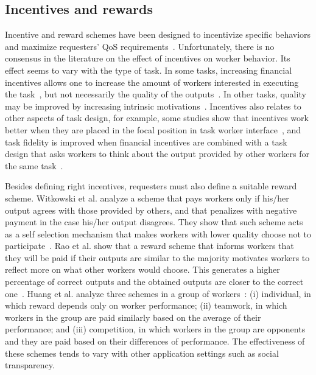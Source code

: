 \documentclass[11pt]{bmc_article_s50}
\begin{document}
\subsection{Incentives and rewards}

Incentive and reward schemes have been designed to incentivize specific behaviors and maximize requesters' QoS requirements~\cite{Singla:www:2013,Singer:www:2013,Scekic:CommunACM:2013}. Unfortunately, there is no consensus in the literature on the effect of incentives on worker behavior. Its effect seems to vary with the type of task. In some tasks, increasing financial incentives allows one to increase the amount of workers interested in executing the task~\cite{Barowy:2012,Mason:2009,Archak:2010}, but not necessarily the quality of the outputs~\cite{Mason:2009}. In other tasks, quality may be improved by increasing intrinsic motivations~\cite{Rogstadius:ICWSM:2011}. Incentives also relates to other aspects of task design, for example, some studies show that incentives work better when they are placed in the focal position in task worker interface~\cite{Chandler:HCOMP:2011}, and task fidelity is improved when financial incentives are combined with a task design that asks workers to think about the output provided by other workers for the same task~\cite{Shaw:CSCW:2011}.

Besides defining right incentives, requesters must also define a suitable reward scheme. Witkowski et al. analyze a scheme that pays workers only if his/her output agrees with those provided by others, and that penalizes with negative payment in the case his/her output disagrees. They show that such scheme acts as a self selection mechanism that makes workers with lower quality choose not to participate~\cite{Witkowski:2013}. Rao et al. show that a reward scheme that informs workers that they will be paid if their outputs are similar to the majority motivates workers to reflect more on what other workers would choose. This generates a higher percentage of correct outputs and the obtained outputs are closer to the correct one~\cite{Rao:2013}. Huang et al. analyze three schemes in a group of workers~\cite{Huang:CHI:2013}: (i) individual, in which reward depends only on worker performance; (ii) teamwork, in which workers in the group are paid similarly based on the average of their performance; and (iii) competition, in which workers in the group are opponents and they are paid based on their differences of performance. The effectiveness of these schemes tends to vary with other application settings such as social transparency.
\end{document}
